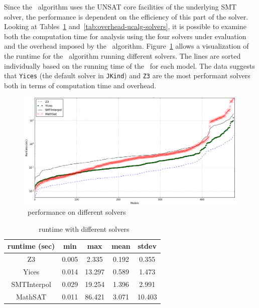 Since the \ucalg\ algorithm uses the UNSAT core facilities of the
underlying SMT solver, the performance is dependent on the efficiency
of this part of the solver. Looking at Tables~\ref{tab:runtime-ucalg-solvers}
and~\ref{tab:overhead-ucalg-solvers}, it is possible to examine both the
computation time for analysis using the four solvers under evaluation
and the overhead imposed by the \ucalg\ algorithm.
Figure~\ref{fig:perf-solvers} allows a visualization of the runtime for
the \ucalg\ algorithm running different solvers. The lines are sorted individually based on the running time of the \ucalg\ for each model. The data suggests that
\texttt{Yices} (the default solver in \texttt{JKind}) and \texttt{Z3} are the most performant
solvers both in terms of computation time and overhead.

\begin{figure}
  \centering
  \includegraphics[width=\textwidth]{figs/performance_solvers.png}
    \vspace{-0.1in}
  \caption{\ucalg\ performance on different solvers}
  \label{fig:perf-solvers}
\end{figure}

\begin{table}
  \caption{\ucalg\ runtime with different solvers}
  \centering
  \begin{tabular}{ |c||c|c|c|c| }
    \hline
     runtime (sec) & min & max & mean & stdev \\[0.5ex]
    \hline\hline
    Z3   & 0.005 & 2.335 & 0.192 & 0.355 \\[0.5ex]
    Yices &   0.014  & 13.297   & 0.589 & 1.473 \\[0.5ex]
    SMTInterpol& 0.029 & 19.254 &  1.396 & 2.991 \\[0.5ex]
    MathSAT & 0.011 & 86.421 &  3.071 & 10.403 \\[0.5ex]
    \hline
  \end{tabular} \\
  \label{tab:runtime-ucalg-solvers}
\end{table}

